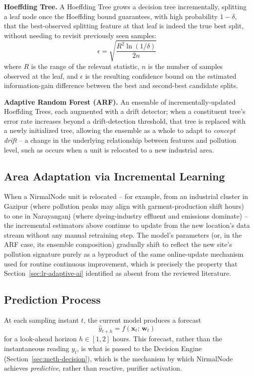 \textbf{Hoeffding Tree.} A Hoeffding Tree grows a decision tree incrementally, splitting a leaf node once the Hoeffding bound guarantees, with high probability $1-\delta$, that the best-observed splitting feature at that leaf is indeed the true best split, without needing to revisit previously seen samples:
\begin{equation}
\epsilon = \sqrt{\frac{R^2 \ln(1/\delta)}{2n}}
\label{eq:hoeffding}
\end{equation}
where $R$ is the range of the relevant statistic, $n$ is the number of samples observed at the leaf, and $\epsilon$ is the resulting confidence bound on the estimated information-gain difference between the best and second-best candidate splits.

\textbf{Adaptive Random Forest (ARF).} An ensemble of incrementally-updated Hoeffding Trees, each augmented with a drift detector; when a constituent tree's error rate increases beyond a drift-detection threshold, that tree is replaced with a newly initialized tree, allowing the ensemble as a whole to adapt to \emph{concept drift} -- a change in the underlying relationship between features and pollution level, such as occurs when a unit is relocated to a new industrial area.

\subsection{Area Adaptation via Incremental Learning}
When a NirmalNode unit is relocated -- for example, from an industrial cluster in Gazipur (where pollution peaks may align with garment-production shift hours) to one in Narayanganj (where dyeing-industry effluent and emissions dominate) -- the incremental estimators above continue to update from the new location's data stream without any manual retraining step. The model's parameters (or, in the ARF case, its ensemble composition) gradually shift to reflect the new site's pollution signature purely as a byproduct of the same online-update mechanism used for routine continuous improvement, which is precisely the property that Section~\ref{sec:lr-adaptive-ai} identified as absent from the reviewed literature.

\subsection{Prediction Process}
At each sampling instant $t$, the current model produces a forecast
\begin{equation}
\hat{y}_{t+h} = f(\mathbf{x}_t;\, \mathbf{w}_t)
\label{eq:forecast}
\end{equation}
for a look-ahead horizon $h \in [1,2]$ hours. This forecast, rather than the instantaneous reading $y_t$, is what is passed to the Decision Engine (Section~\ref{sec:meth-decision}), which is the mechanism by which NirmalNode achieves \emph{predictive}, rather than reactive, purifier activation.

